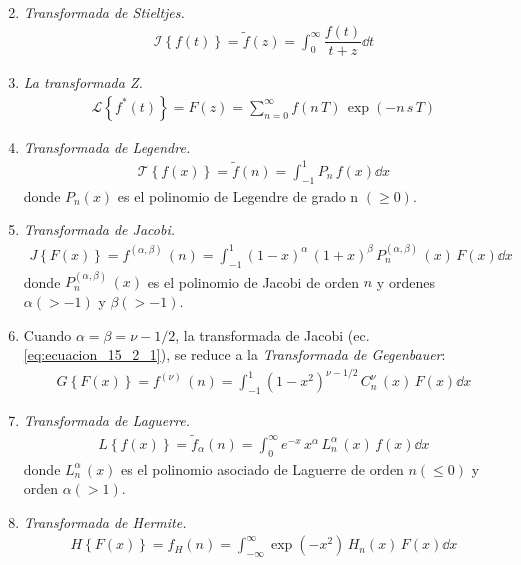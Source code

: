 \begin{enumerate}
\begin{align}
\label{eq:ecuacion_9_2_1}
\end{align}
\item \emph{Transformada de Stieltjes.}
\begin{align}
\mathscr{I} \left\{ f(t) \right\} = \tilde{f} (z) = \int_{0}^{\infty} \dfrac{f(t)}{t + z} \dd{t}
\label{eq:ecuacion_9_7_2}
\end{align}
\item \emph{La transformada Z.}
\begin{align}
\mathscr{L} \left\{ f^{*} (t) \right\} = F(z) = \sum_{n=0}^{\infty} f( n\, T) \, \exp(- n \, s \, T)
\label{eq:ecuacion_12_3_1}
\end{align}
\item \emph{Transformada de Legendre.}
\begin{align}
\mathscr{T} \left\{ f(x) \right\} = \tilde{f} (n) = \int_{-1}^{1} P_{n} \, f(x) \dd{x}
\label{eq:ecuacion_14_2_1}
\end{align}
donde $P_{n}(x)$ es el polinomio de Legendre de grado n $(\geq 0)$.
\item \emph{Transformada de Jacobi.}
\begin{align}
J \left\{ F(x) \right\} = f^{(\alpha, \beta)} \, (n) = \int_{-1}^{1} (1 - x)^{\alpha} \, (1 + x)^{\beta} \, P_{n}^{(\alpha, \beta)} \, (x) \, F(x) \dd{x}
\label{eq:ecuacion_15_2_1}
\end{align}
donde $P_{n}^{(\alpha, \beta)} \, (x)$ es el polinomio de Jacobi de orden $n$ y ordenes $\alpha (> -1)$ y $\beta (> -1)$.
\item Cuando $\alpha = \beta = \nu - 1/2$, la transformada de Jacobi (ec. \ref{eq:ecuacion_15_2_1}), se reduce a la \emph{Transformada de Gegenbauer}:
\begin{align}
G \left\{ F(x) \right\} = f^{(\nu)} \, (n) = \int_{-1}^{1} (1 - x^{2})^{\nu - 1/2} \, C_{n}^{\nu} \, (x) \, F(x) \dd{x}
\label{eq:ecuacion_15_2_4}
\end{align}
\item \emph{Transformada de Laguerre.}
\begin{align}
L \left\{ f(x) \right\} = \tilde{f}_{\alpha} (n) = \int_{0}^{\infty} e^{-x} \, x^{\alpha} \, L_{n}^{\alpha} \, (x) \, f(x) \dd{x}
\label{eq:ecuacion_16_2_1}
\end{align}
donde $L_{n}^{\alpha} \, (x)$ es el polinomio asociado de Laguerre de orden $n (\leq 0)$ y orden $\alpha (> 1)$.
\item \emph{Transformada de Hermite.}
\begin{align}
H \left\{ F(x) \right\} = f_{H} (n) = \int_{-\infty}^{\infty} \exp(-x^{2}) \, H_{n} (x) \, F(x) \dd{x}

\end{align}
\end{enumerate}
